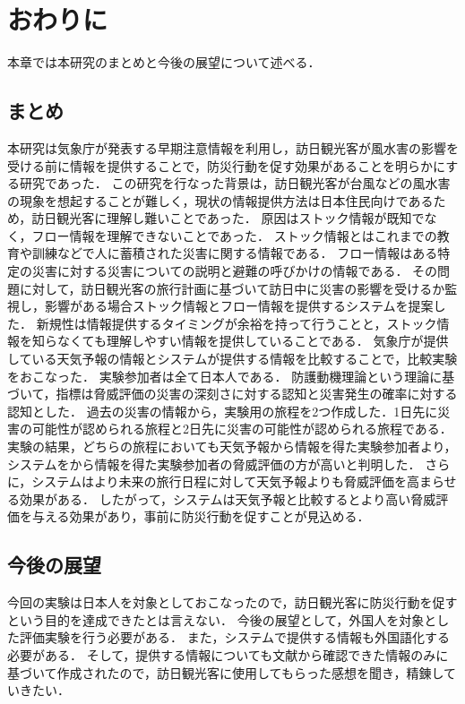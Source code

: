 \documentclass[a4paper,11pt,oneside,openany]{jsbook}
\begin{document}
\chapter{おわりに}
本章では本研究のまとめと今後の展望について述べる．

\section{まとめ}
本研究は気象庁が発表する早期注意情報を利用し，訪日観光客が風水害の影響を受ける前に情報を提供することで，防災行動を促す効果があることを明らかにする研究であった．
この研究を行なった背景は，訪日観光客が台風などの風水害の現象を想起することが難しく，現状の情報提供方法は日本住民向けであるため，訪日観光客に理解し難いことであった．
原因はストック情報が既知でなく，フロー情報を理解できないことであった．
ストック情報とはこれまでの教育や訓練などで人に蓄積された災害に関する情報である．
フロー情報はある特定の災害に対する災害についての説明と避難の呼びかけの情報である．
その問題に対して，訪日観光客の旅行計画に基づいて訪日中に災害の影響を受けるか監視し，影響がある場合ストック情報とフロー情報を提供するシステムを提案した．
新規性は情報提供するタイミングが余裕を持って行うことと，ストック情報を知らなくても理解しやすい情報を提供していることである．
気象庁が提供している天気予報の情報とシステムが提供する情報を比較することで，比較実験をおこなった．
実験参加者は全て日本人である．
防護動機理論という理論に基づいて，指標は脅威評価の災害の深刻さに対する認知と災害発生の確率に対する認知とした．
過去の災害の情報から，実験用の旅程を2つ作成した．1日先に災害の可能性が認められる旅程と2日先に災害の可能性が認められる旅程である．
実験の結果，どちらの旅程においても天気予報から情報を得た実験参加者より，システムをから情報を得た実験参加者の脅威評価の方が高いと判明した．
さらに，システムはより未来の旅行日程に対して天気予報よりも脅威評価を高まらせる効果がある．
したがって，システムは天気予報と比較するとより高い脅威評価を与える効果があり，事前に防災行動を促すことが見込める．

\section{今後の展望}
今回の実験は日本人を対象としておこなったので，訪日観光客に防災行動を促すという目的を達成できたとは言えない．
今後の展望として，外国人を対象とした評価実験を行う必要がある．
また，システムで提供する情報も外国語化する必要がある．
そして，提供する情報についても文献から確認できた情報のみに基づいて作成されたので，訪日観光客に使用してもらった感想を聞き，精錬していきたい．
%
\end{document}
